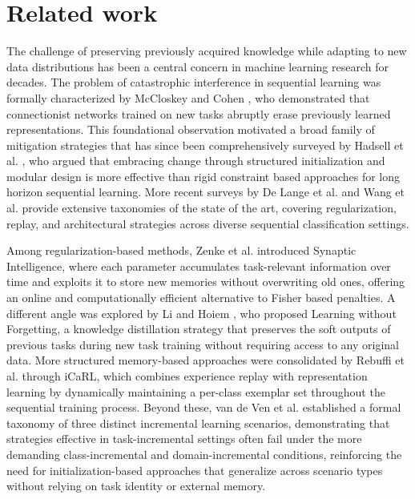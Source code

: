 \documentclass[conference]{IEEEtran}
\begin{document}
\section{Related work}\label{sec:Related}

The challenge of preserving previously acquired knowledge while adapting to new data distributions has been a central concern in machine learning research for decades. The problem of catastrophic interference in sequential learning was formally characterized by McCloskey and Cohen \cite{McCloskey89}, who demonstrated that connectionist networks trained on new tasks abruptly erase previously learned representations. This foundational observation motivated a broad family of mitigation strategies that has since been comprehensively surveyed by Hadsell et al. \cite{Hadsell20}, who argued that embracing change through structured initialization and modular design is more effective than rigid constraint based approaches for long horizon sequential learning. More recent surveys by De Lange et al. \cite{Lange22} and Wang et al. \cite{Wang24} provide extensive taxonomies of the state of the art, covering regularization, replay, and architectural strategies across diverse sequential classification settings.

Among regularization-based methods, Zenke et al. \cite{Zenke17} introduced Synaptic Intelligence, where each parameter accumulates task-relevant information over time and exploits it to store new memories without overwriting old ones, offering an online and computationally efficient alternative to Fisher based penalties. A different angle was explored by Li and Hoiem \cite{Li18}, who proposed Learning without Forgetting, a knowledge distillation strategy that preserves the soft outputs of previous tasks during new task training without requiring access to any original data. More structured memory-based approaches were consolidated by Rebuffi et al. \cite{Rebuffi17} through iCaRL, which combines experience replay with representation learning by dynamically maintaining a per-class exemplar set throughout the sequential training process. Beyond these, van de Ven et al. \cite{Ven22} established a formal taxonomy of three distinct incremental learning scenarios, demonstrating that strategies effective in task-incremental settings often fail under the more demanding class-incremental and domain-incremental conditions, reinforcing the need for initialization-based approaches that generalize across scenario types without relying on task identity or external memory.
\end{document}
